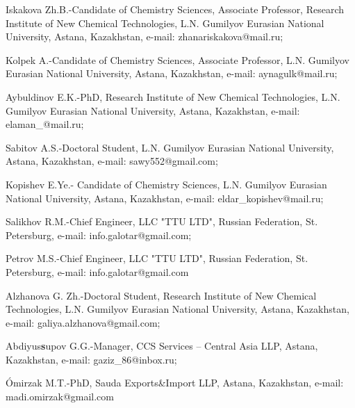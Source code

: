 Iskakova Zh.B.-Candidate of Chemistry Sciences, Associate Professor,
Research Institute of New Chemical Technologies, L.N. Gumilyov Eurasian
National University, Astana, Kazakhstan, e-mail: zhanariskakova@mail.ru;

Kolpek A.-Candidate of Chemistry Sciences, Associate Professor, L.N.
Gumilyov Eurasian National University, Astana, Kazakhstan, e-mail:
aynagulk@mail.ru;

Aybuldinov E.K.-PhD, Research Institute of New Chemical Technologies,
L.N. Gumilyov Eurasian National University, Astana, Kazakhstan, e-mail:
elaman\_@mail.ru;

Sabitov A.S.-Doctoral Student, L.N. Gumilyov Eurasian National
University, Astana, Kazakhstan, e-mail: sawy552@gmail.com;

Kopishev E.Ye.- Candidate of Chemistry Sciences, L.N. Gumilyov Eurasian
National University, Astana, Kazakhstan, e-mail:
eldar\_kopishev@mail.ru;

Salikhov R.M.-Chief Engineer, LLC "TTU LTD", Russian Federation, St.
Petersburg, e-mail: info.galotar@gmail.com;

Petrov M.S.-Chief Engineer, LLC "TTU LTD", Russian Federation, St.
Petersburg, e-mail: info.galotar@gmail.com

Alzhanova G. Zh.-Doctoral Student, Research Institute of New Chemical
Technologies, L.N. Gumilyov Eurasian National University, Astana,
Kazakhstan, e-mail: galiya.alzhanova@gmail.com;

Abdiyus{\bfseries s}upov G.G.-Manager, CCS Services -- Central Asia LLP,
Astana, Kazakhstan, e-mail: gaziz\_86@inbox.ru;

Ómirzak M.T.-PhD, Sauda Exports\&Import LLP, Astana, Kazakhstan, e-mail:
madi.omirzak@gmail.com
